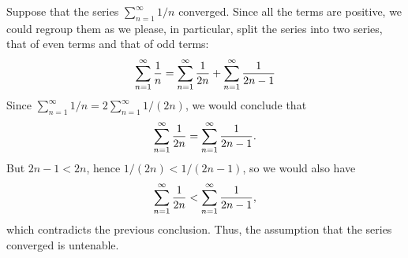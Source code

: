 \documentclass[12pt]{article}
\begin{document}
Suppose that the series $\sum_{n=1}^\infty 1/n$ converged.  Since all the terms are positive,
we could regroup them as we please, in particular, split the series into two series, that of
even terms and that of odd terms:
\[
 \sum_{n=1}^{\infty} {1 \over n} =
 \sum_{n=1}^{\infty} {1 \over 2n} +
 \sum_{n=1}^{\infty} {1 \over 2n-1}
\]
Since $\sum_{n=1}^\infty 1/n = 2 \sum_{n=1}^\infty 1/(2n)$, we would conclude that
\[
 \sum_{n=1}^{\infty} {1 \over 2n} =
 \sum_{n=1}^{\infty} {1 \over 2n-1} .
\]
But $2n-1 < 2n$, hence $1/(2n) < 1/(2n-1)$, so we would also have
\[
 \sum_{n=1}^{\infty} {1 \over 2n} <
 \sum_{n=1}^{\infty} {1 \over 2n-1} ,
\]
which contradicts the previous conclusion.  Thus, the assumption that the
series converged is untenable.
\end{document}
